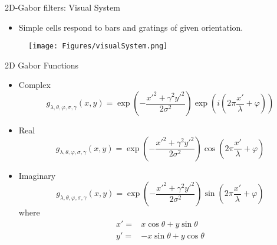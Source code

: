 \begin{frame}{2D-Gabor filters: Visual System}
\begin{itemize}
\item Simple cells respond to bars and gratings of given
orientation.
\end{itemize}
\begin{figure}
\texttt{[image: Figures/visualSystem.png]}
\end{figure}
\end{frame}

\begin{frame}{2D Gabor Functions}
\begin{itemize}
\item Complex
\begin{equation}
{g_{\lambda ,\theta ,\varphi ,\sigma ,\gamma }}(x,y) = \exp \left( { - \frac{{x{'^2} + {\gamma ^2}y{'^2}}}{{2{\sigma ^2}}}} \right)\exp \left( i\left({2\pi \frac{{x'}}{\lambda } + \varphi }\right) \right)\nonumber
\end{equation}
\item Real
\begin{equation}
{g_{\lambda ,\theta ,\varphi ,\sigma ,\gamma }}(x,y) = \exp \left( { - \frac{{x{'^2} + {\gamma ^2}y{'^2}}}{{2{\sigma ^2}}}} \right)\cos \left( {2\pi \frac{{x'}}{\lambda } + \varphi } \right)\nonumber
\end{equation}
\item Imaginary
\begin{equation}
{g_{\lambda ,\theta ,\varphi ,\sigma ,\gamma }}(x,y) = \exp \left( { - \frac{{x{'^2} + {\gamma ^2}y{'^2}}}{{2{\sigma ^2}}}} \right)\sin \left( {2\pi \frac{{x'}}{\lambda } + \varphi } \right)\nonumber
\end{equation}
where
\begin{align*}
x'=&x\cos \theta +y\sin \theta\\
y'=&-x\sin \theta +y\cos \theta\\
\end{align*}
\end{itemize}
\end{frame}
